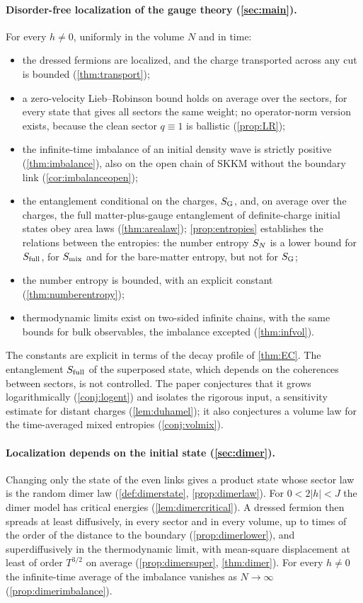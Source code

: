 \documentclass[11pt]{article}
\theoremstyle{stmtplain}
\theoremstyle{stmtdef}
\begin{document}
\paragraph{Disorder-free localization of the gauge theory (\cref{sec:main}).}
For every $h\neq0$, uniformly in the volume $N$ and in time:
\begin{itemize}[leftmargin=1.5em]
\item the dressed fermions are localized, and the charge transported across any cut is bounded
  (\cref{thm:transport});
\item a zero-velocity Lieb--Robinson bound holds on average over the sectors, for every state that gives all sectors
  the same weight; no operator-norm version exists, because the clean sector $q\equiv1$ is ballistic
  (\cref{prop:LR});
\item the infinite-time imbalance of an initial density wave is strictly positive (\cref{thm:imbalance}), also on
  the open chain of SKKM without the boundary link (\cref{cor:imbalanceopen});
\item the entanglement conditional on the charges, $S_{\mathrm{G}}$, and, on average over the charges, the full
  matter-plus-gauge entanglement of definite-charge initial states obey area laws (\cref{thm:arealaw});
  \cref{prop:entropies} establishes the relations between the entropies: the number entropy $S_{N}$ is a lower bound
  for $S_{\mathrm{full}}$, for $S_{\mathrm{mix}}$ and for the bare-matter entropy, but not for $S_{\mathrm{G}}$;
\item the number entropy is bounded, with an explicit constant (\cref{thm:numberentropy});
\item thermodynamic limits exist on two-sided infinite chains, with the same bounds for bulk observables, the
  imbalance excepted (\cref{thm:infvol}).
\end{itemize}
The constants are explicit in terms of the decay profile of \cref{thm:EC}. The entanglement $S_{\mathrm{full}}$ of the
superposed state, which depends on the coherences between sectors, is not controlled. The paper conjectures that it
grows logarithmically (\cref{conj:logent}) and isolates the rigorous input, a sensitivity estimate for distant
charges (\cref{lem:duhamel}); it also conjectures a volume law for the time-averaged mixed entropies
(\cref{conj:volmix}).

\paragraph{Localization depends on the initial state (\cref{sec:dimer}).}
Changing only the state of the even links gives a product state whose sector law is the random dimer law
(\cref{def:dimerstate}, \cref{prop:dimerlaw}). For $0<2|h|<J$ the dimer model has critical energies
(\cref{lem:dimercritical}). A dressed fermion then spreads at least diffusively, in every sector and in every volume,
up to times of the order of the distance to the boundary (\cref{prop:dimerlower}), and superdiffusively in the
thermodynamic limit, with mean-square displacement at least of order $T^{3/2}$ on average (\cref{prop:dimersuper},
\cref{thm:dimer}). For every $h\neq0$ the infinite-time average of the imbalance vanishes as $N\to\infty$
(\cref{prop:dimerimbalance}).
\end{document}
